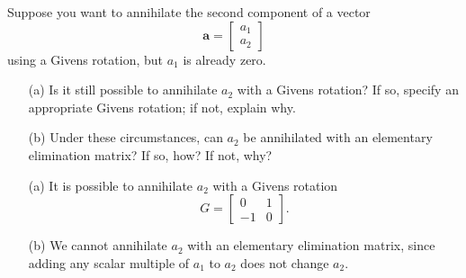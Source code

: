 \begin{pro}
  Suppose you want to annihilate the second component of a vector
  \begin{displaymath}
    \mathbf{a} =
    \begin{bmatrix}
      a_1 \\ a_2
    \end{bmatrix}
  \end{displaymath}
  using a Givens rotation, but $a_1$ is already zero.
  \begin{itemize}
  \item[(a)]
    Is it still possible to annihilate $a_2$ with a Givens rotation?
    If so, specify an appropriate Givens rotation; if not, explain
    why.

  \item[(b)]
    Under these circumstances,
    can $a_2$ be annihilated with an elementary elimination matrix?
    If so, how? If not, why?
  \end{itemize}
\end{pro}

\begin{sol}
  \begin{itemize}
  \item[(a)]
    It is possible to annihilate $a_2$ with a Givens rotation
    \begin{displaymath}
      G =
      \begin{bmatrix}
        0 & 1 \\
        -1 & 0
      \end{bmatrix}.
    \end{displaymath}

  \item[(b)]
    We cannot annihilate $a_2$ with an elementary elimination matrix,
    since adding any scalar multiple of $a_1$ to $a_2$ does not change $a_2$.
  \end{itemize}
\end{sol}

